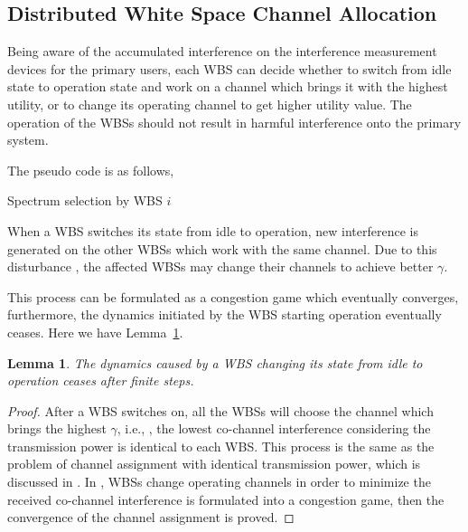 \documentclass[times]{ettauth}
\newcommand{\ie}{i.e., }
\theoremstyle{mytheoremstyle}
\theoremstyle{mytheoremstyle}
\theoremstyle{mytheoremstyle}
\newtheorem{lemma}{Lemma}[section]
\begin{document}
\subsection{Distributed White Space Channel Allocation}
\label{WhiteSussa}
Being aware of the accumulated interference on the interference measurement devices for the primary users, each WBS can decide whether to switch from idle state to operation state and work on a channel which brings it with the highest utility, or to change its operating channel to get higher utility value.
The operation of the WBSs should not result in harmful interference onto the primary system.

The pseudo code is as follows,

\begin{algorithm}[h]
\caption{Spectrum selection by WBS $i$}          %
\label{whiteSussAlgo} 
\DontPrintSemicolon
\SetAlgoLined
{}

	\end{algorithm}


When a WBS switches its state from idle to operation, new interference is generated on the other WBSs which work with the same channel.
Due to this disturbance , the affected WBSs may change their channels to achieve better $\gamma$.

This process can be formulated as a congestion game which eventually converges, furthermore, the dynamics initiated by the WBS starting operation eventually ceases. 
Here we have Lemma~\ref{scheme2Lemma}.
\begin{lemma}
\label{scheme2Lemma}
\emph{The dynamics caused by a WBS changing its state from idle to operation ceases after finite steps.}
\end{lemma}
\begin{proof}
After a WBS switches on, all the WBSs will choose the channel which brings the highest $\gamma$, \ie, the lowest co-channel interference considering the transmission power is identical to each WBS.
This process is the same as the problem of channel assignment with identical transmission power, which is discussed in \cite{allerton08_liu}.
In \cite{allerton08_liu}, WBSs change operating channels in order to minimize the received co-channel interference is formulated into a congestion game, then the convergence of the channel assignment is proved.
\end{proof}
\end{document}
